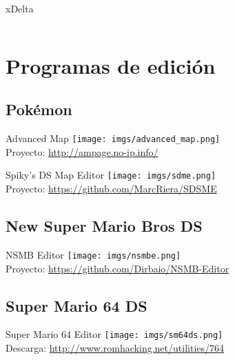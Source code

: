 \begin{frame}{xDelta}
\begin{columns}
\begin{column}{0.3\textwidth}
        \vfill
    \end{column}
    \end{columns}
\end{frame}

\section{Programas de edición}
\subsection{Pokémon}
\begin{frame}{Advanced Map}
    \centering
    \texttt{[image: imgs/advanced\_map.png]} \\
    Proyecto: \url{http://ampage.no-ip.info/}
\end{frame}

\begin{frame}{Spiky's DS Map Editor}
    \centering
    \texttt{[image: imgs/sdme.png]} \\
    Proyecto: \url{https://github.com/MarcRiera/SDSME}
\end{frame}

\subsection{New Super Mario Bros DS}
\begin{frame}{NSMB Editor}
    \centering
    \texttt{[image: imgs/nsmbe.png]} \\
    Proyecto: \url{https://github.com/Dirbaio/NSMB-Editor}
\end{frame}

\subsection{Super Mario 64 DS}
\begin{frame}{Super Mario 64 Editor}
    \centering
    \texttt{[image: imgs/sm64ds.png]} \\
    Descarga: \url{http://www.romhacking.net/utilities/764}
\end{frame}

